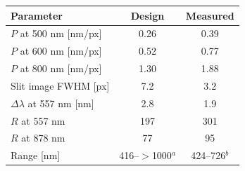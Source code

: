 \begin{tabular}{@{}lcc@{}}
\toprule
Parameter & Design & Measured \\
\midrule
$P$ at 500 nm [nm/px] & 0.26 & 0.39 \\
$P$ at 600 nm [nm/px] & 0.52 & 0.77 \\
$P$ at 800 nm [nm/px] & 1.30 & 1.88 \\
Slit image FWHM [px] & 7.2 & 3.2 \\
$\Delta\lambda$ at 557 nm [nm] & 2.8 & 1.9 \\
$R$ at 557 nm & 197 & 301 \\
$R$ at 878 nm & 77 & 95 \\
Range [nm] & 416--$>$1000$^a$ & 424--726$^b$ \\
\bottomrule
\end{tabular}
